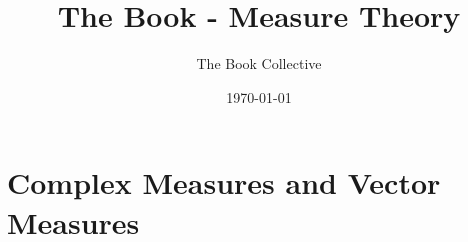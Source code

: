 \documentclass[twoside, 11pt]{book}
\title{The Book - Measure Theory}
\author{The Book Collective}
\date{\today}
\numberwithin{equation}{section}
\begin{document}
\maketitle

\tableofcontents

\chapter{Complex Measures and Vector Measures}





























\end{document}
